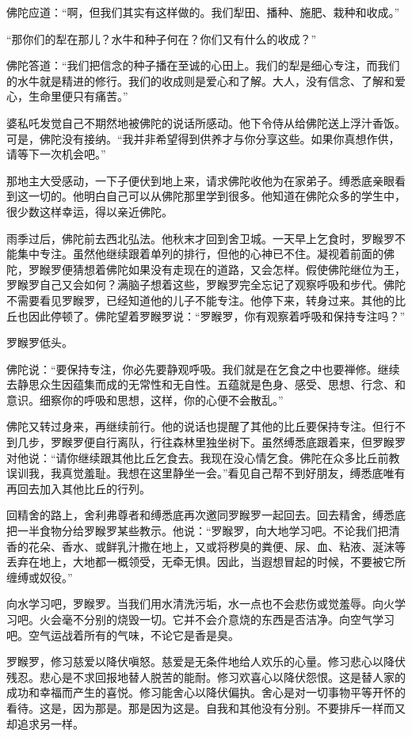 \documentclass[12pt,twoside,openany]{book}
\begin{document}
佛陀应道：“啊，但我们其实有这样做的。我们犁田、播种、施肥、栽种和收成。”

“那你们的犁在那儿？水牛和种子何在？你们又有什么的收成？”

佛陀答道：“我们把信念的种子播在至诚的心田上。我们的犁是细心专注，而我们的水牛就是精进的修行。我们的收成则是爱心和了解。大人，没有信念、了解和爱心，生命里便只有痛苦。”

婆私吒发觉自己不期然地被佛陀的说话所感动。他下令侍从给佛陀送上浮汁香饭。可是，佛陀没有接纳。“我并非希望得到供养才与你分享这些。如果你真想作供，请等下一次机会吧。”

那地主大受感动，一下子便伏到地上来，请求佛陀收他为在家弟子。缚悉底亲眼看到这一切的。他明白自己可以从佛陀那里学到很多。他知道在佛陀众多的学生中，很少数这样幸运，得以亲近佛陀。

雨季过后，佛陀前去西北弘法。他秋末才回到舍卫城。一天早上乞食时，罗睺罗不能集中专注。虽然他继续跟着单列的排行，但他的心神已不住。凝视着前面的佛陀，罗睺罗便猜想着佛陀如果没有走现在的道路，又会怎样。假使佛陀继位为王，罗睺罗自己又会如何？满脑子想着这些，罗睺罗完全忘记了观察呼吸和步代。佛陀不需要看见罗睺罗，已经知道他的儿子不能专注。他停下来，转身过来。其他的比丘也因此停顿了。佛陀望着罗睺罗说：“罗睺罗，你有观察着呼吸和保持专注吗？”

罗睺罗低头。

佛陀说：“要保持专注，你必先要静观呼吸。我们就是在乞食之中也要禅修。继续去静思众生因蕴集而成的无常性和无自性。五蕴就是色身、感受、思想、行念、和意识。细察你的呼吸和思想，这样，你的心便不会散乱。”

佛陀又转过身来，再继续前行。他的说话也提醒了其他的比丘要保持专注。但行不到几步，罗睺罗便自行离队，行往森林里独坐树下。虽然缚悉底跟着来，但罗睺罗对他说：“请你继续跟其他比丘乞食去。我现在没心情乞食。佛陀在众多比丘前教误训我，我真觉羞耻。我想在这里静坐一会。”看见自己帮不到好朋友，缚悉底唯有再回去加入其他比丘的行列。

回精舍的路上，舍利弗尊者和缚悉底再次邀同罗睺罗一起回去。回去精舍，缚悉底把一半食物分给罗睺罗某些教示。他说：“罗睺罗，向大地学习吧。不论我们把清香的花朵、香水、或鲜乳汁撒在地上，又或将秽臭的粪便、尿、血、粘液、涎沫等丢弃在地上，大地都一概领受，无牵无惧。因此，当遐想冒起的时候，不要被它所缠缚或奴役。”

向水学习吧，罗睺罗。当我们用水清洗污垢，水一点也不会悲伤或觉羞辱。向火学习吧。火会毫不分别的烧毁一切。它并不会介意烧的东西是否洁净。向空气学习吧。空气运战着所有的气味，不论它是香是臭。

罗睺罗，修习慈爱以降伏嗔怒。慈爱是无条件地给人欢乐的心量。修习悲心以降伏残忍。悲心是不求回报地替人脱苦的能耐。修习欢喜心以降伏怨恨。这是替人家的成功和幸福而产生的喜悦。修习能舍心以降伏偏执。舍心是对一切事物平等开怀的看待。这是，因为那是。那是因为这是。自我和其他没有分别。不要排斥一样而又却追求另一样。
\end{document}
